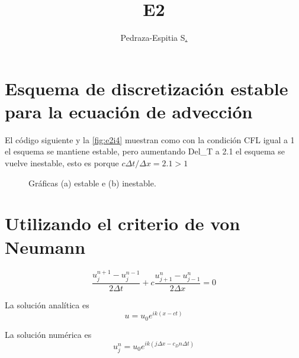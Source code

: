 \documentclass{article}
\title{E2}
\author{Pedraza-Espitia S\href{https://pedraza-espitia.github.io/modnum}{.}}
\date{}
\begin{document}
\maketitle

\section{Esquema de discretización estable para la ecuación de advección}
El código siguiente y la \autoref{fig:e2i4} muestran como con la condición CFL igual a 1 el esquema se mantiene estable, pero aumentando Del\_T a 2.1 el esquema se vuelve inestable, esto es porque $c\Delta t/\Delta x = 2.1 > 1$

\begin{figure}[!ht]
\centering
  \hfill{}\hfill
  \hfill
  \caption{Gráficas (a) estable e (b) inestable.}%
\label{fig:e2i4}
\end{figure}

\section{Utilizando el criterio de von Neumann}
\begin{equation}
	\frac{u_j^{n+1}-u_j^{n-1}}{2\Delta t} + c \frac{u_{j+1}^{n}-u_{j-1}^{n}}{2\Delta x} = 0
	\label{eq:adveccion}
\end{equation}

La solución analítica es
\begin{equation}
	u = u_0 e^{ik(x - c t)}
\end{equation}

La solución numérica es
\begin{equation}
	u_{j}^{n} = u_0 e^{ik(j\Delta x - c_D n \Delta t)}
	\label{eq:solnumerica}
\end{equation}
\end{document}
